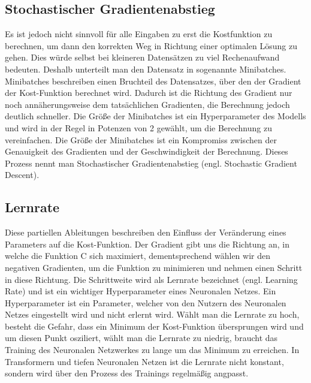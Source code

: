 \subsection{Stochastischer Gradientenabstieg}
Es ist jedoch nicht sinnvoll für alle Eingaben zu erst die Kostfunktion zu berechnen, um dann den korrekten Weg in Richtung einer optimalen Lösung zu gehen.
Dies würde selbst bei kleineren Datensätzen zu viel Rechenaufwand bedeuten.
Deshalb unterteilt man den Datensatz in sogenannte Minibatches.
Minibatches beschreiben einen Bruchteil des Datensatzes, über den der Gradient der Kost-Funktion berechnet wird.
Dadurch ist die Richtung des Gradient nur noch annäherungsweise dem tatsächlichen Gradienten, die Berechnung jedoch deutlich schneller.
Die Größe der Minibatches ist ein Hyperparameter des Modells und wird in der Regel in Potenzen von 2 gewählt, um die Berechnung zu vereinfachen.
Die Größe der Minibatches ist ein Kompromiss zwischen der Genauigkeit des Gradienten und der Geschwindigkeit der Berechnung.
Dieses Prozess nennt man Stochastischer Gradientenabstieg (engl. Stochastic Gradient Descent).

\subsection{Lernrate}
Diese partiellen Ableitungen beschreiben den Einfluss der Veränderung eines Parameters auf die Kost-Funktion. Der Gradient gibt uns die Richtung an, in welche die Funktion C sich maximiert, dementsprechend wählen wir den negativen Gradienten, um die Funktion zu minimieren und nehmen einen Schritt in diese Richtung. Die Schrittweite wird als Lernrate bezeichnet (engl. Learning Rate) und ist ein wichtiger Hyperparameter eines Neuronalen Netzes.
Ein Hyperparameter ist ein Parameter, welcher von den Nutzern des Neuronalen Netzes eingestellt wird und nicht erlernt wird. Wählt man die Lernrate zu hoch, besteht die Gefahr, dass ein Minimum der Kost-Funktion übersprungen wird und um diesen Punkt osziliert, wählt man die Lernrate zu niedrig, braucht das Training des Neuronalen Netzwerkes zu lange um das Minimum zu erreichen.
In Transformern und tiefen Neuronalen Netzen ist die Lernrate nicht konstant, sondern wird über den Prozess des Trainings regelmäßig angpasst. 

